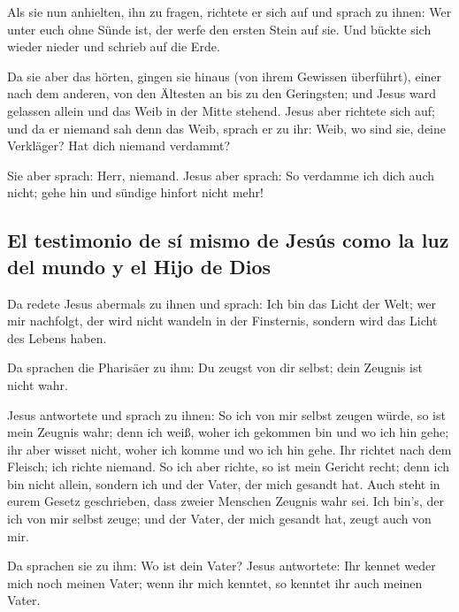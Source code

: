  Als sie nun anhielten, ihn zu fragen, richtete er sich
auf und sprach zu ihnen: Wer unter euch ohne Sünde ist, der werfe den
ersten Stein auf sie.  Und bückte sich wieder nieder und
schrieb auf die Erde.

 Da sie aber das hörten, gingen sie hinaus (von ihrem
Gewissen überführt), einer nach dem anderen, von den Ältesten an bis zu
den Geringsten; und Jesus ward gelassen allein und das Weib in der Mitte
stehend.  Jesus aber richtete sich auf; und da er niemand
sah denn das Weib, sprach er zu ihr: Weib, wo sind sie, deine Verkläger?
Hat dich niemand verdammt?

 Sie aber sprach: Herr, niemand. Jesus aber sprach: So
verdamme ich dich auch nicht; gehe hin und sündige hinfort nicht mehr!

\hypertarget{el-testimonio-de-suxed-mismo-de-jesuxfas-como-la-luz-del-mundo-y-el-hijo-de-dios}{%
\subsection{El testimonio de sí mismo de Jesús como la luz del mundo y
el Hijo de
Dios}\label{el-testimonio-de-suxed-mismo-de-jesuxfas-como-la-luz-del-mundo-y-el-hijo-de-dios}}

 Da redete Jesus abermals zu ihnen und sprach: Ich bin
das Licht der Welt; wer mir nachfolgt, der wird nicht wandeln in der
Finsternis, sondern wird das Licht des Lebens haben.

 Da sprachen die Pharisäer zu ihm: Du zeugst von dir
selbst; dein Zeugnis ist nicht wahr.

 Jesus antwortete und sprach zu ihnen: So ich von mir
selbst zeugen würde, so ist mein Zeugnis wahr; denn ich weiß, woher ich
gekommen bin und wo ich hin gehe; ihr aber wisset nicht, woher ich komme
und wo ich hin gehe.  Ihr richtet nach dem Fleisch; ich
richte niemand.  So ich aber richte, so ist mein Gericht
recht; denn ich bin nicht allein, sondern ich und der Vater, der mich
gesandt hat.  Auch steht in eurem Gesetz geschrieben,
dass zweier Menschen Zeugnis wahr sei.  Ich bin's, der
ich von mir selbst zeuge; und der Vater, der mich gesandt hat, zeugt
auch von mir.

 Da sprachen sie zu ihm: Wo ist dein Vater? Jesus
antwortete: Ihr kennet weder mich noch meinen Vater; wenn ihr mich
kenntet, so kenntet ihr auch meinen Vater.

